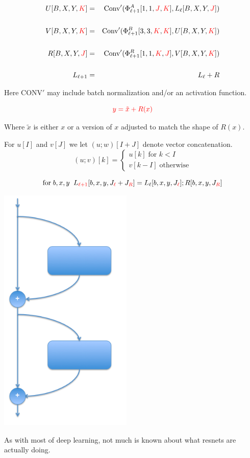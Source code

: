 {{\huge
\begin{eqnarray*}
U[B,X,Y,{\color{red} K}] & = & \mathrm{Conv}'(\Phi^A_{\ell+1}{ [1,1,{\color{red} J},{\color{red} K}]},L_\ell[B,X,Y,{\color{red} J}]) \\
\\
V[B,X,Y,{\color{red} K}] & = & \mathrm{Conv}'(\Phi^B_{\ell+1}{[3,3,{\color{red} K},{\color{red} K}]},U[B,X,Y,{\color{red} K}]) \\
\\
R[B,X,Y,{\color{red} J}] & = & \mathrm{Conv}'(\Phi^R_{\ell+1}{ [1,1,{\color{red} K},{\color{red} J}]},V[B,X,Y,{\color{red} K}]) \\
\\
L_{ \ell+1} & = & L_\ell + R
\end{eqnarray*}
}

\vfill
Here $\mathrm{CONV}'$ may include batch normalization and/or an activation function.


$${\color{red} y = \tilde{x} + R(x)}$$

\vfill
Where $\tilde{x}$ is either $x$ or a version of $x$ adjusted to match the shape of $R(x)$.


For {\color{red} $u[I]$} and {\color{red} $v[J]$} we let {\color{red} $(u;w)[I+J]$} denote vector concatenation.
\vfill
$$(u;v)[k] = \left\{\begin{array}{l} u[k]\;\mbox{for $k < I$} \\ v[k-I] \;\mbox{otherwise} \end{array}\right.$$

\vfill
$$\mbox{for}\;b,x,y\;\;L_{\color{red} \ell + 1}[b,x,y,J_{\color{red} \ell} + J_{\color{red} R}] = L_\ell[b,x,y,J_{\color{red} \ell}];R[b,x,y,J_{\color{red} R}]$$


\vfill
\includegraphics[width= 2.5in]{../images/resnet}
\hfill \begin{minipage}[b]{4in} As with most of deep learning, not much is known about what resnets are actually doing.
  

\end{minipage}}
